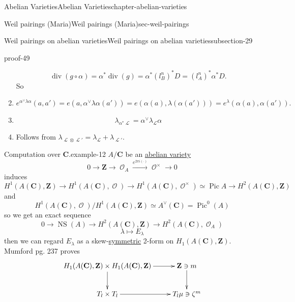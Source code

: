 \documentclass[oneside,10pt,]{book}
\numberwithin{equation}{section}
\newcommand{\sheaf}[1]{\operatorname{\mathcal{#1}}}
\newcommand{\ZZ}{\mathbf{Z}}
\newcommand{\CC}{\mathbf{C}}
\DeclareMathOperator{\divisor}{div}
\DeclareMathOperator{\Pic}{Pic}
\DeclareMathOperator{\NS}{NS}
\begin{document}
\begin{chapterptx}{Abelian Varieties}{}{Abelian Varieties}{}{}{chapter-abelian-varieties}
\begin{sectionptx}{Weil pairings (Maria)}{}{Weil pairings (Maria)}{}{}{sec-weil-pairings}
\begin{subsectionptx}{Weil pairings on abelian varieties}{}{Weil pairings on abelian varieties}{}{}{subsection-29}
\begin{proofptx}{}{proof-49}
\begin{enumerate}
\begin{equation*}
\divisor(g\circ \alpha) = \alpha^*\divisor (g) = \alpha^*(l^n_B)^* D = (l_A^n)^* \alpha^* D\text{.}
\end{equation*}
So%
\item\hypertarget{li-53}{}%
\begin{equation*}
e^{\alpha^{\vee}\lambda \alpha} (a,a') = e(a, \alpha^\vee\lambda \alpha(a')) = e(\alpha(a),\lambda (\alpha(a'))) = e^\lambda (\alpha(a), \alpha(a'))\text{.}
\end{equation*}
%
\item\hypertarget{li-54}{}%
\begin{equation*}
\lambda_{\alpha^* \sheaf L} = \alpha^\vee \lambda_{\sheaf L} \alpha
\end{equation*}
%
\item\hypertarget{li-55}{}Follows from \(\lambda_{\sheaf L\otimes \sheaf L'} = \lambda_{\sheaf L} + \lambda_{\sheaf L'}\).%
\end{enumerate}
%
\end{proofptx}
\begin{example}{Computation over \(\CC\).}{example-12}%
\hypertarget{p-308}{}%
\(A/\CC\) be an \hyperref[def-buntes-abvar]{abelian variety}%
\begin{equation*}
0\to \ZZ \to \sheaf O_A \xrightarrow{e^{2\pi i (\cdot)}} \sheaf O^\times \to 0
\end{equation*}
induces%
\begin{equation*}
H^1(A(\CC), \ZZ) \to H^1(A(\CC), \sheaf O) \to H^1(A(\CC), \sheaf O^\times) \simeq \Pic A \to H^2(A(\CC), \ZZ)
\end{equation*}
and%
\begin{equation*}
H^1(A(\CC), \sheaf O)/ H^1(A(\CC), \ZZ) \simeq A^\vee(\CC) = \Pic^0(A)
\end{equation*}
so we get an exact sequence%
\begin{equation*}
0 \to \NS(A) \to H^2 (A(\CC),\ZZ) \to H^2(A(\CC),\sheaf O_A)
\end{equation*}
%
\begin{equation*}
\lambda \mapsto E_\lambda
\end{equation*}
then we can regard \(E_\lambda\) as a skew-\hyperref[def-princ-pol]{symmetric} 2-form on \(H_1(A(\CC), \ZZ)\). Mumford pg. 237 proves%
\begin{equation*}
\xymatrix{
H_1(A(\CC), \ZZ) \times H_1(A(\CC), \ZZ) \ar[r] \ar[d] & \ZZ\ni m \ar[d] \\
T_l \times T_l \ar[r] & T_l \mu \ni \zeta^m
}
\end{equation*}

\end{example}
\end{subsectionptx}
\end{sectionptx}
\end{chapterptx}
\end{document}
